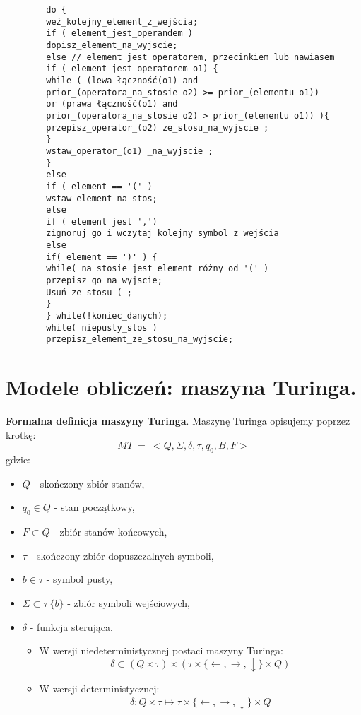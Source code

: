\documentclass[main.tex]{subfiles}
\begin{document}
    \begin{verbatim}
        do {
        weź_kolejny_element_z_wejścia;
        if ( element_jest_operandem )
        dopisz_element_na_wyjscie;
        else // element jest operatorem, przecinkiem lub nawiasem
        if ( element_jest_operatorem o1) {
        while ( (lewa łączność(o1) and
        prior_(operatora_na_stosie o2) >= prior_(elementu o1))
        or (prawa łączność(o1) and
        prior_(operatora_na_stosie o2) > prior_(elementu o1)) ){
        przepisz_operator_(o2) ze_stosu_na_wyjscie ;
        }
        wstaw_operator_(o1) _na_wyjscie ;
        }
        else
        if ( element == '(' )
        wstaw_element_na_stos;
        else
        if ( element jest ',')
        zignoruj go i wczytaj kolejny symbol z wejścia
        else
        if( element == ')' ) {
        while( na_stosie_jest element różny od '(' )
        przepisz_go_na_wyjscie;
        Usuń_ze_stosu_( ;
        }
        } while(!koniec_danych);
        while( niepusty_stos )
        przepisz_element_ze_stosu_na_wyjscie;
    \end{verbatim}

    \newpage

    \section{Modele obliczeń: maszyna Turinga.}

    \begin{definition}
        \textbf{Formalna definicja maszyny Turinga}. Maszynę Turinga opisujemy poprzez krotkę:
        \[MT ~ = ~<Q, \Sigma, \delta, \tau, q_0, B, F >\]
        gdzie:
        \begin{itemize}
            \item $Q$ - skończony zbiór stanów,
            \item $q_0 \in Q$ - stan początkowy,
            \item $F \subset Q$ - zbiór stanów końcowych,
            \item $\tau$  - skończony zbiór dopuszczalnych symboli,
            \item $b \in \tau$  - symbol pusty,
            \item $\Sigma \subset \tau \ \{b\} $ - zbiór symboli wejściowych,
            \item $\delta$ - funkcja sterująca.
            \begin{itemize}
                \item W wersji niedeterministycznej postaci maszyny Turinga:
                \[ \delta \subset (Q \times \tau)  \times (\tau \times \{\leftarrow, \rightarrow, \downarrow\}  \times Q)\]
                \item W wersji deterministycznej:
                \[ \delta : Q \times \tau \mapsto \tau \times \{\leftarrow, \rightarrow, \downarrow\} \times Q\]
            \end{itemize}
        \end{itemize}
    \end{definition}
\end{document}
